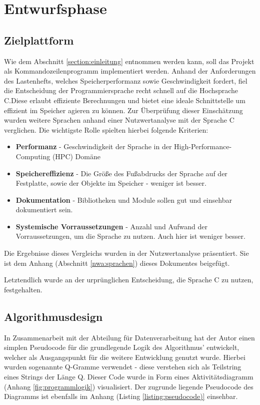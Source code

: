 \section{Entwurfsphase}
\label{section:entwurfsphase}
\subsection{Zielplattform}
Wie dem Abschnitt \ref{section:einleitung} entnommen werden kann, soll das Projekt als Kommandozeilenprogramm
implementiert werden. Anhand der Anforderungen des Lastenhefts, welches Speicherperformanz sowie Geschwindigkeit fordert,
fiel die Entscheidung der Programmiersprache recht schnell auf die Hochsprache C.Diese erlaubt effiziente Berechnungen und bietet eine ideale Schnittstelle um effizient im Speicher agieren zu können.
Zur Überprüfung dieser Einschätzung wurden weitere Sprachen anhand einer
Nutzwertanalyse mit der Sprache C verglichen. Die wichtigste Rolle spielten hierbei folgende Kriterien:
\begin{itemize}
    \item \textbf{Performanz} - Geschwindigkeit der Sprache in der High-Performance-Computing (HPC) Domäne
    \item \textbf{Speichereffizienz} - Die Größe des Fußabdrucks der Sprache auf der Festplatte, sowie der Objekte im Speicher - weniger ist besser.
    \item \textbf{Dokumentation} - Bibliotheken und Module sollen gut und einsehbar dokumentiert sein.
    \item \textbf{Systemische Vorraussetzungen} - Anzahl und Aufwand der Vorraussetzungen, um die Sprache zu nutzen. Auch hier ist weniger besser.
\end{itemize}

Die Ergebnisse dieses Vergleichs wurden in der Nutzwertanalyse präsentiert.
Sie ist dem Anhang (Abschnitt \ref{nwa:sprachen})  dieses Dokumentes beigefügt.\par
Letztendlich wurde an der urprünglichen Entscheidung, die Sprache C zu nutzen, festgehalten.

\subsection{Algorithmusdesign}
In Zusammenarbeit mit der Abteilung für Datenverarbeitung hat der Autor einen simplen
Pseudocode für die grundlegende Logik des Algorithmus' entwickelt, welcher als Ausgangspunkt
für die weitere Entwicklung genutzt wurde. Hierbei wurden sogenannte Q-Gramme verwendet - 
diese verstehen sich als Teilstring eines Strings der Länge Q. Dieser Code wurde in Form eines
Aktivitätsdiagramm (Anhang \ref{fig:programmlogik}) visualisiert. Der zugrunde liegende  Pseudocode des Diagramms ist ebenfalls im Anhang (Listing \ref{listing:pseudocode)} einsehbar.


